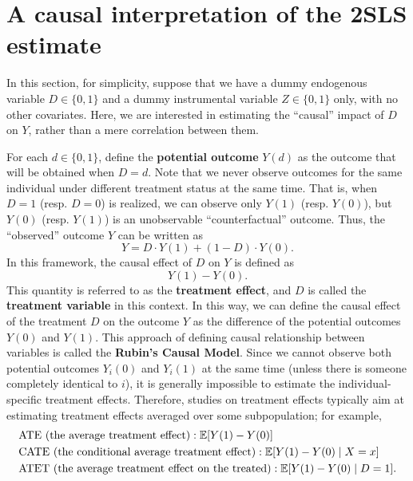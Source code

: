 \documentclass[11pt, A4paper, openany, uplatex]{book}
\begin{document}
 
\section{A causal interpretation of the 2SLS estimate}

In this section, for simplicity, suppose that we have a dummy endogenous variable $D \in \{0,1\}$ and a dummy instrumental variable $Z \in \{0,1\}$ only, with no other covariates.
Here, we are interested in estimating the ``causal'' impact of $D$ on $Y$, rather than a mere correlation between them.

For each $d \in \{0,1\}$, define the \textbf{potential outcome} $Y(d)$ as the outcome that will be obtained when $D = d$.
Note that we never observe outcomes for the same individual under different treatment status at the same time.
That is, when $D = 1$ (resp. $D = 0$) is realized, we can observe only $Y(1)$ (resp. $Y(0)$), but $Y(0)$ (resp. $Y(1)$) is an unobservable ``counterfactual'' outcome.
Thus, the ``observed'' outcome $Y$ can be written as
\[
	Y = D \cdot Y(1) + (1 - D) \cdot Y(0).
\]
In this framework, the causal effect of $D$ on $Y$ is defined as
\[
	Y(1) - Y(0).
\]
This quantity is referred to as the \textbf{treatment effect}, and $D$ is called the \textbf{treatment variable} in this context.
In this way, we can define the causal effect of the treatment $D$ on the outcome $Y$ as the difference of the potential outcomes $Y(0)$ and $Y(1)$.
This approach of defining causal relationship between variables is called the \textbf{Rubin's Causal Model}.
Since we cannot observe both potential outcomes $Y_i(0)$ and $Y_i(1)$ at the same time (unless there is someone completely identical to $i$), it is generally impossible to estimate the individual-specific treatment effects.
Therefore, studies on treatment effects typically aim at estimating treatment effects averaged over some subpopulation; for example, 
\begin{align*}
	&\text{ATE (the average treatment effect)}: \mathbb{E}[Y(1) - Y(0)]\\
	&\text{CATE (the conditional average treatment effect)}: \mathbb{E}[Y(1) - Y(0) \mid X = x] \\
	&\text{ATET (the average treatment effect on the treated)}: \mathbb{E}[Y(1) - Y(0) \mid D = 1].
\end{align*}
\end{document}
